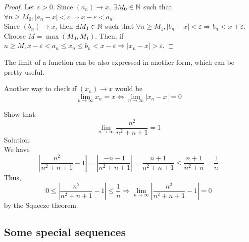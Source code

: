 \begin{proof}
    Let $\varepsilon > 0$. Since $(a_n) \to x$, $\exists M_0 \in \mathbb{N}$ such that $\forall n \geq M_0, |a_n-x| < \varepsilon \Rightarrow x-\varepsilon < a_n$.\\
    Since $(b_n) \to x$, then $\exists M_1 \in \mathbb{N}$ such that $\forall n \geq M_1, |b_n-x|<\varepsilon \Rightarrow b_n < x + \varepsilon$. \\
    Choose $M = \max( M_0, M_1)$. Then, if $n \geq M, x-\varepsilon < a_n \leq x_n \leq b_n < x-\varepsilon \Rightarrow |x_n-x|>\varepsilon$.
\end{proof}

The limit of a function can be also expressed in another form, which can be pretty useful.

\begin{theorem}
    Another way to check if $(x_n) \to x$ would be
    \begin{equation*}
        \lim \limits_{n \to \infty} x_n = x \Longleftrightarrow \lim \limits_{n \to \infty} |x_n - x| = 0
    \end{equation*}
\end{theorem}

\begin{eg}
    Show that:
    \begin{equation*}
        \lim \limits_{n \to \infty} \frac{n^2}{n^2+n+1} = 1
    \end{equation*}    
    Solution:\\
    We have
    \begin{equation*}
        \left |
            \frac{n^2}{n^2+n+1} - 1
        \right | = 
        \left |
            \frac{-n-1}{n^2+n+1}
        \right | = 
        \frac{n+1}{n^2+n+1} \leq
        \frac{n+1}{n^2+n} = \frac{1}{n}
    \end{equation*}
    Thus,
    \begin{equation*}
        0 \leq 
        \left |
            \frac{n^2}{n^2+n+1} - 1
        \right |
        \leq
        \frac{1}{n}
        \Longrightarrow
        \lim \limits_{n \to \infty}
        \left |
            \frac{n^2}{n^2+n+1} - 1
        \right | = 0
    \end{equation*}
    by the Squeeze theorem.
\end{eg}

\subsection{Some special sequences}

